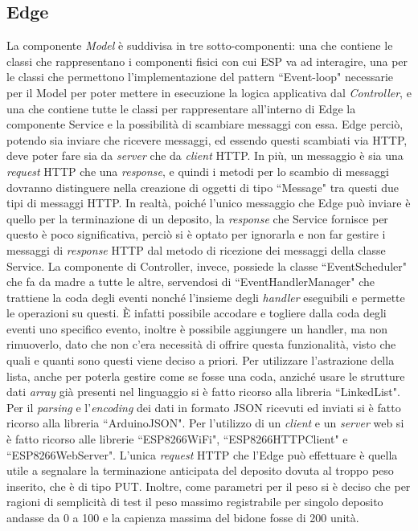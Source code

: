\documentclass[a4paper, 12pt]{report}
\begin{document}
			\subsection{Edge}
			La componente \textit{Model} è suddivisa in tre sotto-componenti: una che contiene le classi che
			rappresentano i componenti fisici con cui ESP va ad interagire, una per le classi che permettono l'implementazione del pattern ``Event-loop" necessarie per il Model per poter
			mettere in esecuzione la logica applicativa dal \textit{Controller}, e una che contiene
			tutte le classi per rappresentare
			all'interno di Edge la componente Service e la possibilità di scambiare messaggi con essa.
			Edge perciò, potendo sia inviare che ricevere messaggi, ed essendo questi scambiati via
			HTTP, deve poter fare sia da \textit{server} che da \textit{client} HTTP. In più, un
			messaggio è sia una \textit{request} HTTP che una \textit{response}, e quindi i metodi per lo
			scambio di messaggi dovranno distinguere nella creazione di oggetti di tipo ``Message" tra
			questi due tipi di messaggi HTTP. In realtà, poiché l'unico messaggio che Edge può inviare
			è quello per la terminazione di un deposito, la \textit{response} che Service fornisce per
			questo è poco significativa, perciò si è optato per ignorarla e non far gestire i
			messaggi di \textit{response} HTTP dal metodo di ricezione dei messaggi della classe Service.\newline 
			La componente di Controller, invece, possiede la classe ``EventScheduler" che fa da madre a tutte le
			altre, servendosi di ``EventHandlerManager" che trattiene la
			coda degli eventi nonché l'insieme degli \textit{handler} eseguibili e permette le operazioni
			su questi. È infatti possibile accodare e togliere dalla coda degli eventi uno specifico
			evento, inoltre è possibile aggiungere un handler, ma non rimuoverlo, dato che non c'era
			necessità di offrire questa funzionalità, visto che quali e quanti sono questi viene deciso
			a priori.\newline
			Per utilizzare l'astrazione della lista, anche per poterla gestire come se fosse una coda,
			anziché usare le strutture dati \textit{array} già presenti nel linguaggio si è fatto
			ricorso alla libreria ``LinkedList". Per il \textit{parsing} e l'\textit{encoding} dei dati in formato
			JSON ricevuti ed inviati si è fatto ricorso alla libreria ``ArduinoJSON". Per l'utilizzo di
			un \textit{client} e un \textit{server} web si è fatto ricorso alle
			librerie ``ESP8266WiFi", ``ESP8266HTTPClient" e ``ESP8266WebServer".\newline
			L'unica \textit{request} HTTP che l'Edge può effettuare è quella utile a segnalare la
			terminazione anticipata del deposito dovuta al troppo peso inserito, che è di tipo PUT.
			Inoltre, come parametri per il peso si è deciso che per ragioni di semplicità di test il peso
			massimo registrabile per singolo deposito andasse da 0 a 100 e la capienza massima del bidone
			fosse di 200 unità.
\end{document}
